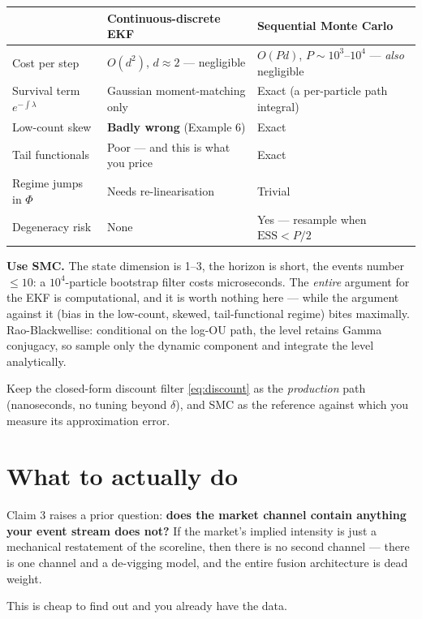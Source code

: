 \documentclass[11pt,a4paper]{article}
\theoremstyle{plain}
\begin{document}
\begin{center}
\small
\begin{tabular}{@{}p{3.5cm}p{5.1cm}p{5.9cm}@{}}
\toprule
& \textbf{Continuous-discrete EKF} & \textbf{Sequential Monte Carlo} \\
\midrule
Cost per step & $O(d^2)$, $d\approx2$ --- negligible & $O(Pd)$, $P\sim10^3$--$10^4$ --- \emph{also} negligible \\
Survival term $e^{-\int\lambda}$ & Gaussian moment-matching only & Exact (a per-particle path integral) \\
Low-count skew & \textbf{Badly wrong} (Example 6) & Exact \\
Tail functionals & Poor --- and this is what you price & Exact \\
Regime jumps in $\Phi$ & Needs re-linearisation & Trivial \\
Degeneracy risk & None & Yes --- resample when $\mathrm{ESS}<P/2$ \\
\bottomrule
\end{tabular}
\end{center}

\begin{point}
\textbf{Use SMC.} The state dimension is 1--3, the horizon is short, the events number
$\le10$: a $10^4$-particle bootstrap filter costs microseconds. The \emph{entire} argument for
the EKF is computational, and it is worth nothing here --- while the argument against it (bias
in the low-count, skewed, tail-functional regime) bites maximally. Rao-Blackwellise: conditional
on the log-OU path, the level retains Gamma conjugacy, so sample only the dynamic component and
integrate the level analytically.

\smallskip
Keep the closed-form discount filter \eqref{eq:discount} as the \emph{production} path
(nanoseconds, no tuning beyond $\delta$), and SMC as the reference against which you measure its
approximation error.
\end{point}

\section{What to actually do}
\label{sec:experiment}

\begin{warnbox}[title={THE ONE EXPERIMENT THAT DECIDES EVERYTHING}]
Claim 3 raises a prior question: \textbf{does the market channel contain anything your event
stream does not?} If the market's implied intensity is just a mechanical restatement of the
scoreline, then there is no second channel --- there is one channel and a de-vigging model, and
the entire fusion architecture is dead weight.

\smallskip
This is cheap to find out and you already have the data.
\end{warnbox}
\end{document}
